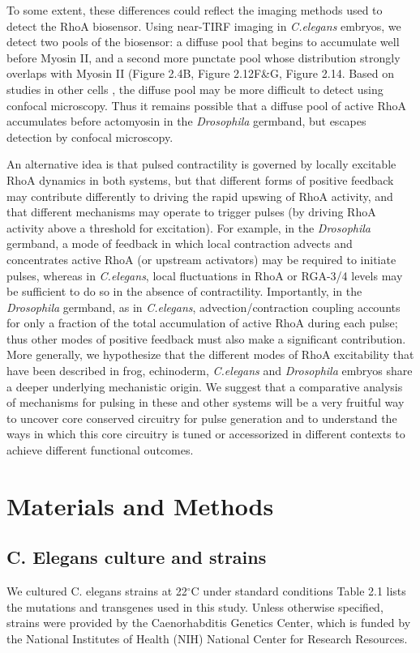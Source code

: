 \documentclass{ucetd}
\begin{document}
To some extent, these differences could reflect the imaging methods used to detect the RhoA biosensor.  Using near-TIRF imaging in \textit{C.elegans} embryos, we detect two pools of the biosensor: a diffuse pool that begins to accumulate well before Myosin II, and a second more punctate pool whose distribution strongly overlaps with Myosin II (Figure 2.4B, Figure 2.12F&G, Figure 2.14.  Based on studies in other cells \cite{Weiner:2007cl}, the diffuse pool may be more difficult to detect using confocal microscopy. Thus it remains possible that a diffuse pool of active RhoA accumulates before actomyosin in the \textit{Drosophila} germband, but escapes detection by confocal microscopy.  

An alternative idea is that pulsed contractility is governed by locally excitable RhoA dynamics in both systems, but that different forms of positive feedback may contribute differently to driving the rapid upswing of RhoA activity, and that different mechanisms may operate to trigger pulses (by driving RhoA activity above a threshold for excitation). For example, in the \textit{Drosophila} germband, a mode of feedback in which local contraction advects and concentrates active RhoA (or upstream activators) may be required to initiate pulses, whereas in \textit{C.elegans}, local fluctuations in RhoA or RGA-3/4 levels may be sufficient to do so in the absence of contractility. Importantly, in the \textit{Drosophila} germband, as in \textit{C.elegans}, advection/contraction coupling accounts for only a fraction of the total accumulation of active RhoA during each pulse; thus other modes of positive feedback must also make a significant contribution. 
More generally, we hypothesize that the different modes of RhoA excitability that have been described in frog, echinoderm, \textit{C.elegans} and \textit{Drosophila} embryos share a deeper underlying mechanistic origin. We suggest that a comparative analysis of mechanisms for pulsing in these and other systems will be a very fruitful way to uncover core conserved circuitry for pulse generation and to understand the ways in which this core circuitry is tuned or accessorized in different contexts to achieve different functional outcomes.  




\section{Materials and Methods}
\subsection{C. Elegans culture and strains}
We cultured C. elegans strains at 22$^{\circ}$C under standard conditions \cite{Brenner:1974wn} Table 2.1 lists the mutations and transgenes used in this study. Unless otherwise specified, strains were provided by the Caenorhabditis Genetics Center, which is funded by the National Institutes of Health (NIH) National Center for Research Resources.
\end{document}
